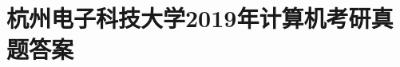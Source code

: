 \begin{comment}
\subsection{九、(本大题共15分)}
设MIPS单周期CPU结构和数据通路如图2所示，数据流动方向由箭头所示，图中的三个二选一电路的控制信号定于如表2所示，指令各字段含义如下:\newline
OP:操作码，func：指令的功能码，imm:指令中的16bit的立即数，rt：寄存器rt地址，rd：寄存器rd地址；寄存器和存储器字长都是32bit，R\_Addr\_A,R\_Addr\_B分别是寄存器堆的二个读端口地址输入端，W\_Addr是寄存器堆的写端口地址输入端，W\_Data是寄存器堆的写输入输入端口，R\_Data\_A和R\_Data\_B分别是寄存器堆的二个数据输出端，图2中二选一电路选择信号和部分指令译码输出的控制信号的取值定义如表2所示.\newline
\begin{figure}[H]
	\centering  %
	\texttt{[image: example/chapter23/Annotation2019-09-28124114.png]}
\end{figure}
\begin{figure}[H]
	\centering  %
	\texttt{[image: example/chapter23/Annotation2019-09-28124147.png]}
\end{figure}
若执行指令:ANDi rt, rs, imm; 位与：(rs)\&imm->rt\newline
1. (本小题6分) 写出当执行该指令是的数据通路对应的控制信号状态值填入表3中。\newline
\begin{figure}[H]
	\centering  %
	\texttt{[image: example/chapter23/Annotation2019-09-28124513.png]}
\end{figure}
2. (本小题2分) 请解释在图2中，为什么指令从指令存储器读出后，是直接保持在指令总线上而不需要指令寄存器IR来存放指令？\newline
3. (本小题2分) 图2的CPU结构能否实现相对转移指令JNZ rel？为什么？\newline
4. (本小题2分) 设指令中的16bit立即数分别为79FBH和9F69H，则经过符号位扩展后得到的32bit数据分别应为多少?\newline
5. (本小题2分) 图2的体系结构是哈弗结构还是普林斯顿结构?每执行一条指令PC寄存器的值加了多少? \newline
6. (本小题1分) 图2从系统结构来看，属于SISD，SIMD，MISD，MIMD四种结构的哪一种？\newline

\end{comment}



\section{杭州电子科技大学2019年计算机考研真题答案}

